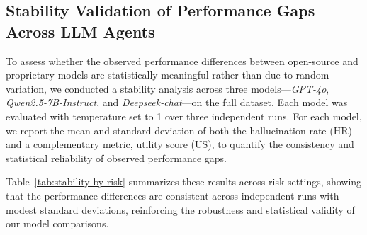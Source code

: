 \subsection{Stability Validation of Performance Gaps Across LLM Agents}
\label{app: stability_validation}
To assess whether the observed performance differences between open-source and proprietary models are statistically meaningful rather than due to random variation, we conducted a stability analysis across three models---\textit{GPT-4o}, \textit{Qwen2.5-7B-Instruct}, and \textit{Deepseek-chat}---on the full dataset. Each model was evaluated with temperature set to 1 over three independent runs. For each model, we report the mean and standard deviation of both the hallucination rate (HR) and a complementary metric, utility score (US), to quantify the consistency and statistical reliability of observed performance gaps.

Table~\ref{tab:stability-by-risk} summarizes these results across risk settings, showing that the performance differences are consistent across independent runs with modest standard deviations, reinforcing the robustness and statistical validity of our model comparisons.

